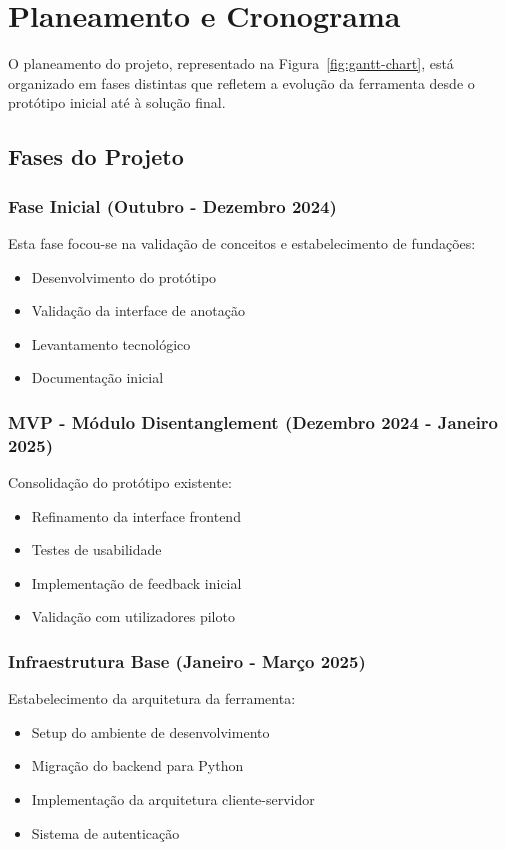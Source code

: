 \section{Planeamento e Cronograma}

O planeamento do projeto, representado na Figura~\ref{fig:gantt-chart}, está organizado em fases distintas que refletem a evolução da ferramenta desde o protótipo inicial até à solução final.

\subsection{Fases do Projeto}

\subsubsection{Fase Inicial (Outubro - Dezembro 2024)}
Esta fase focou-se na validação de conceitos e estabelecimento de fundações:
\begin{itemize}
    \item Desenvolvimento do protótipo
    \item Validação da interface de anotação
    \item Levantamento tecnológico
    \item Documentação inicial
\end{itemize}

\subsubsection{MVP - Módulo Disentanglement (Dezembro 2024 - Janeiro 2025)}
Consolidação do protótipo existente:
\begin{itemize}
    \item Refinamento da interface frontend
    \item Testes de usabilidade
    \item Implementação de feedback inicial
    \item Validação com utilizadores piloto
\end{itemize}

\subsubsection{Infraestrutura Base (Janeiro - Março 2025)}
Estabelecimento da arquitetura da ferramenta:
\begin{itemize}
    \item Setup do ambiente de desenvolvimento
    \item Migração do backend para Python
    \item Implementação da arquitetura cliente-servidor
    \item Sistema de autenticação
\end{itemize}

